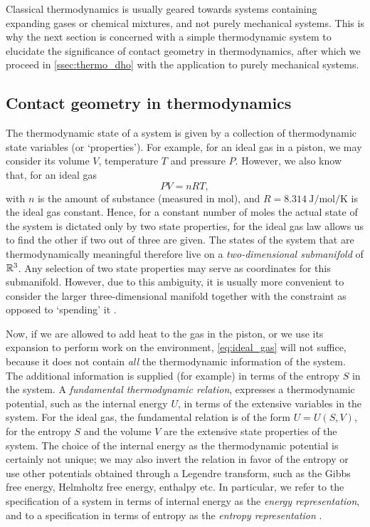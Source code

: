 Classical thermodynamics is usually geared towards systems containing expanding gases or chemical mixtures, and not purely mechanical systems. This is why the next section is concerned with a simple thermodynamic system to elucidate the significance of contact geometry in thermodynamics, after which we proceed in \cref{ssec:thermo_dho} with the application to purely mechanical systems.

\subsection{Contact geometry in thermodynamics} 
The thermodynamic state of a system is given by a collection of thermodynamic state variables (or `properties'). For example, for an ideal gas in a piston, we may consider its volume $V$, temperature $T$ and pressure $P$. However, we also know that, for an ideal gas
\begin{equation}
    PV = nRT,
    \label{eq:ideal_gas}
\end{equation}
with $n$ is the amount of substance (measured in \si{\mole}), and $R = \SI{8.314}{\joule \per \mole \per \kelvin}$ is the ideal gas constant.  Hence, for a constant number of moles the actual state of the system is dictated only by two state properties, for the ideal gas law allows us to find the other if two out of three are given. The states of the system that are thermodynamically meaningful therefore live on a \emph{two-dimensional submanifold} of $\mathbb{R}^3$. Any selection of two state properties may serve as coordinates for this submanifold. However, due to this ambiguity, it is usually more convenient to consider the larger three-dimensional manifold together with the constraint as opposed to `spending' it \cite{Balian2001, Giancoli2014}.

Now, if we are allowed to add heat to the gas in the piston, or we use its expansion to perform work on the environment, \cref{eq:ideal_gas} will not suffice, because it does not contain \emph{all} the thermodynamic information of the system. The additional information is supplied (for example) in terms of the entropy $S$ in the system. A \emph{fundamental thermodynamic relation}, expresses a thermodynamic potential, such as the internal energy $U$, in terms of the extensive variables in the system. For the ideal gas, the fundamental relation is of the form $U = U(S, V)$, for the entropy $S$ and the volume $V$ are the extensive state properties of the system. The choice of the internal energy as the thermodynamic potential is certainly not unique; we may also invert the relation in favor of the entropy or use other potentials obtained through a Legendre transform, such as the Gibbs free energy, Helmholtz free energy, enthalpy etc. In particular, we refer to the specification of a system in terms of internal energy as the \emph{energy representation}, and to a specification in terms of entropy as the \emph{entropy representation} \cite{VanderSchaft2021a}.


